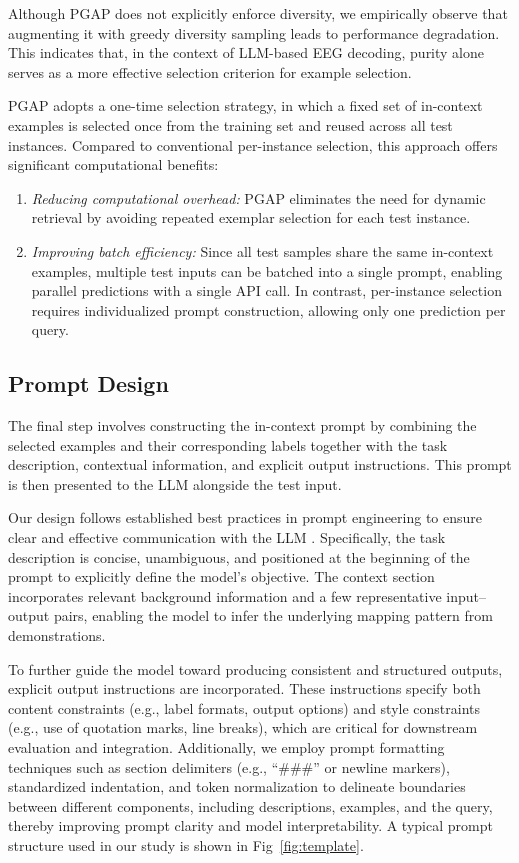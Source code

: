\documentclass[journal,twocolumn]{IEEEtran}
\begin{document}
Although PGAP does not explicitly enforce diversity, we empirically observe that augmenting it with greedy diversity sampling leads to performance degradation. This indicates that, in the context of LLM-based EEG decoding, purity alone serves as a more effective selection criterion for example selection.

PGAP adopts a one-time selection strategy, in which a fixed set of in-context examples is selected once from the training set and reused across all test instances. Compared to conventional per-instance selection, this approach offers significant computational benefits:

\begin{enumerate}
  \item \emph{Reducing computational overhead:} PGAP eliminates the need for dynamic retrieval by avoiding repeated exemplar selection for each test instance.
  \item \emph{Improving batch efficiency:} Since all test samples share the same in-context examples, multiple test inputs can be batched into a single prompt, enabling parallel predictions with a single API call. In contrast, per-instance selection requires individualized prompt construction, allowing only one prediction per query.
\end{enumerate}

\subsection{Prompt Design}

The final step involves constructing the in-context prompt by combining the selected examples and their corresponding labels together with the task description, contextual information, and explicit output instructions. This prompt is then presented to the LLM alongside the test input.

Our design follows established best practices in prompt engineering to ensure clear and effective communication with the LLM \cite{chen2023unleashing}. Specifically, the task description is concise, unambiguous, and positioned at the beginning of the prompt to explicitly define the model's objective. The context section incorporates relevant background information and a few representative input–output pairs, enabling the model to infer the underlying mapping pattern from demonstrations.

To further guide the model toward producing consistent and structured outputs, explicit output instructions are incorporated. These instructions specify both content constraints (e.g., label formats, output options) and style constraints (e.g., use of quotation marks, line breaks), which are critical for downstream evaluation and integration. Additionally, we employ prompt formatting techniques such as section delimiters (e.g., “\#\#\#” or newline markers), standardized indentation, and token normalization to delineate boundaries between different components, including descriptions, examples, and the query, thereby improving prompt clarity and model interpretability. A typical prompt structure used in our study is shown in Fig~\ref{fig:template}.
\end{document}
